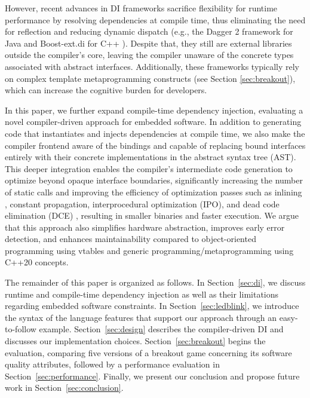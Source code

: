 \documentclass[10pt,sigplan,screen,anonymous]{acmart}
\begin{document}
However, recent advances in DI frameworks sacrifice flexibility for runtime performance by resolving dependencies at compile time, thus eliminating the need for reflection and reducing dynamic dispatch (e.g., the Dagger 2 framework \cite{dagger2} for Java and Boost-ext.di for C++ \cite{boostdi2018}). Despite that, they still are external libraries outside the compiler's core, leaving the compiler unaware of the concrete types associated with abstract interfaces. Additionally, these frameworks typically rely on complex template metaprogramming constructs (see Section \ref{sec:breakout}), which can increase the cognitive burden for developers. 

In this paper, we further expand compile-time dependency injection, evaluating a novel compiler-driven approach for embedded software. In addition to generating code that instantiates and injects dependencies at compile time, we also make the compiler frontend aware of the bindings and capable of replacing bound interfaces entirely with their concrete implementations in the abstract syntax tree (AST). This deeper integration enables the compiler's intermediate code generation to optimize beyond opaque interface boundaries, significantly increasing the number of static calls and improving the efficiency of optimization passes such as inlining \cite{damasio2021}, constant propagation, interprocedural optimization (IPO), and dead code elimination (DCE) \cite{cooper2021compiler}, resulting in smaller binaries and faster execution. We argue that this approach also simplifies hardware abstraction, improves early error detection, and enhances maintainability compared to object-oriented programming using vtables and generic programming/metaprogramming using C++20 concepts.


The remainder of this paper is organized as follows. In Section~\ref{sec:di}, we discuss runtime and compile-time dependency injection as well as their limitations regarding embedded software constraints. In Section~\ref{sec:ledblink}, we introduce the syntax of the language features that support our approach through an easy-to-follow example. Section~\ref{sec:design} describes the compiler-driven DI and discusses our implementation choices. Section~\ref{sec:breakout} begins the evaluation, comparing five versions of a breakout game concerning its software quality attributes, followed by a performance evaluation in Section~\ref{sec:performance}. Finally, we present our conclusion and propose future work in Section~\ref{sec:conclusion}.
\end{document}
